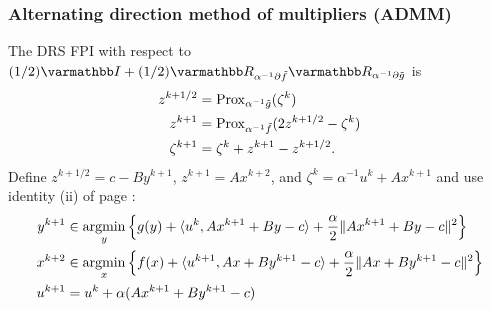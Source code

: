 \documentclass[10pt,mathserif]{beamer}
\begin{document}
\begin{frame}
\frametitle{Alternating direction method of multipliers (ADMM)}
The DRS FPI with respect to
$(1/2)\opI+(1/2)\opR_{\alpha^{-1} \partial \tilde{f}}\opR_{\alpha^{-1} \partial \tilde{g}}$ is
\begin{align*}
z^{k+1/2}&=\mathrm{Prox}_{\alpha^{-1}\tilde{g}}(\zeta^k)\\
z^{k+1}&=\mathrm{Prox}_{\alpha^{-1}\tilde{f}}(2z^{k+1/2}-\zeta^k)\\
\zeta^{k+1}&=\zeta^k+z^{k+1}-z^{k+1/2}.
\end{align*}
Define $z^{k+1/2}=c-By^{k+1}$, $z^{k+1}=Ax^{k+2}$, and $\zeta^k=\alpha^{-1} u ^k+Ax^{k+1}$ and use identity (ii) of page \pageref{frame_ipc_formula2}:
\begin{align*}
y^{k+1}&\in\operatorname*{argmin}_{y}\left\{ g(y)
+\langle u ^k,Ax^{k+1}+By-c\rangle+
\frac{\alpha}{2}\|Ax^{k+1}+By-c\|^2\right\}\\
x^{k+2}&\in\operatorname*{argmin}_{x}\left\{ f(x)+
 \langle u ^{k+1},Ax+By^{k+1}-c\rangle+
\frac{\alpha}{2}\|Ax+By^{k+1}-c
\|^2\right\}\\
 u ^{k+1}&= u ^k+\alpha (Ax^{k+1}+By^{k+1}-c)
\end{align*}
\end{frame}
\end{document}
